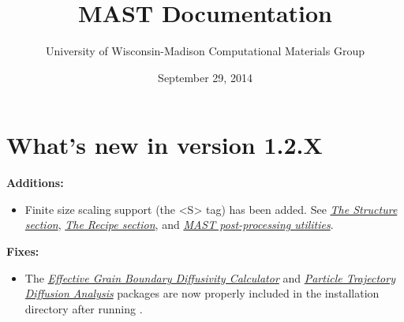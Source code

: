 \documentclass[letterpaper,10pt,english]{sphinxmanual}
\title{MAST Documentation}
\date{September 29, 2014}
\author{University of Wisconsin-Madison Computational Materials Group}
\begin{document}
\maketitle
\tableofcontents
{}\label{index::doc}



\chapter{What's new in version 1.2.X}
\label{16_0_whatsnew::doc}\label{16_0_whatsnew:what-s-new-in-version-1-2-x}\label{16_0_whatsnew:materials-simulation-toolkit-mast-manual}
\textbf{Additions:}
\begin{itemize}
\item {} 
Finite size scaling support (the \textless{}S\textgreater{} tag) has been added. See {\hyperref[3_1_1_structure::doc]{\emph{The Structure section}}}, {\hyperref[3_1_3_recipe::doc]{\emph{The Recipe section}}}, and {\hyperref[6_0_postprocessingtools::doc]{\emph{MAST post-processing utilities}}}.

\end{itemize}

\textbf{Fixes:}
\begin{itemize}
\item {} 
The {\hyperref[8_0_2_gbdiff::doc]{\emph{Effective Grain Boundary Diffusivity Calculator}}} and {\hyperref[8_0_3_diffanalyzer::doc]{\emph{Particle Trajectory Diffusion Analysis}}} packages are now properly included in the installation directory after running .

\end{itemize}
\end{document}
